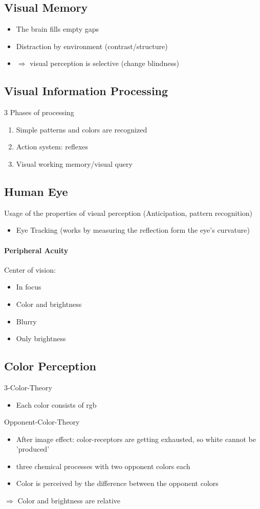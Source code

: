 \documentclass[10pt,a4paper]{article}
\begin{document}
	\subsection{Visual Memory}
		\begin{itemize}
			\item The brain fills empty gaps
			\item Distraction by environment (contrast/structure)
			\item $ \Rightarrow $ visual perception is selective (change blindness)
		\end{itemize}
	\subsection{Visual Information Processing}
		3 Phases of processing
		\begin{enumerate}
			\item Simple patterns and colors are recognized
			\item Action system: reflexes
			\item Visual working memory/visual query
		\end{enumerate}
	\subsection*{Human Eye}
		Usage of the properties of visual perception (Anticipation, pattern recognition)
		\begin{itemize}
			\item Eye Tracking (works by measuring the reflection form the eye's curvature)
		\end{itemize}
	\paragraph{Peripheral Acuity}
		Center of vision:
		\begin{itemize}
			\item In focus
			\item Color and brightness
		\end{itemize}
		\begin{itemize}
			\item Blurry
			\item Only brightness
		\end{itemize}
	
	\subsection{Color Perception}
	3-Color-Theory
	\begin{itemize}
		\item Each color consists of rgb
	\end{itemize}
	Opponent-Color-Theory
	\begin{itemize}
		\item After image effect: color-receptors are getting exhausted, so white cannot be 'produced'
		\item three chemical processes with two opponent colors each 
		\item Color is perceived by the difference between the opponent colors
	\end{itemize}
	$ \Rightarrow $ Color and brightness are relative
	
\end{document}
